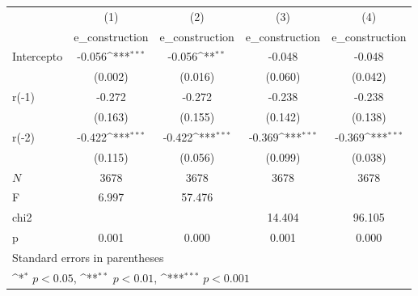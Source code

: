{
\def\sym#1{\ifmmode^{#1}\else\(^{#1}\)\fi}
\begin{longtable}{l*{4}{c}}
\hline\hline\endfirsthead\hline\endhead\hline\endfoot\endlastfoot
            &\multicolumn{1}{c}{(1)}&\multicolumn{1}{c}{(2)}&\multicolumn{1}{c}{(3)}&\multicolumn{1}{c}{(4)}\\
            &\multicolumn{1}{c}{e\_construction}&\multicolumn{1}{c}{e\_construction}&\multicolumn{1}{c}{e\_construction}&\multicolumn{1}{c}{e\_construction}\\
\hline
Intercepto  &      -0.056\sym{***}&      -0.056\sym{**} &      -0.048         &      -0.048         \\
            &     (0.002)         &     (0.016)         &     (0.060)         &     (0.042)         \\
r(-1)       &      -0.272         &      -0.272         &      -0.238         &      -0.238         \\
            &     (0.163)         &     (0.155)         &     (0.142)         &     (0.138)         \\
r(-2)       &      -0.422\sym{***}&      -0.422\sym{***}&      -0.369\sym{***}&      -0.369\sym{***}\\
            &     (0.115)         &     (0.056)         &     (0.099)         &     (0.038)         \\
\hline
\(N\)       &        3678         &        3678         &        3678         &        3678         \\
F           &       6.997         &      57.476         &                     &                     \\
chi2        &                     &                     &      14.404         &      96.105         \\
p           &       0.001         &       0.000         &       0.001         &       0.000         \\
\hline\hline
\multicolumn{5}{l}{\footnotesize Standard errors in parentheses}\\
\multicolumn{5}{l}{\footnotesize \sym{*} \(p<0.05\), \sym{**} \(p<0.01\), \sym{***} \(p<0.001\)}\\
\end{longtable}
}
